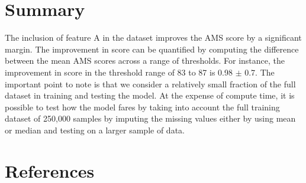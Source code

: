 \documentclass[final,3p,times,onecolumn]{elsarticle}
\begin{document}
\section{Summary}

The inclusion of feature A in the dataset improves the AMS score by a significant margin. The improvement in score can be quantified by computing the difference between the mean AMS scores across a range of thresholds. For instance, the improvement in score in the threshold range of 83 to 87 is 0.98 $\pm$ 0.7. The important point to note is that we consider a relatively small fraction of the full dataset in training and testing the model. At the expense of compute time, it is possible to test how the model fares by taking into account the full training dataset of 250,000 samples by imputing the missing values either by using mean or median and testing on a larger sample of data.

\section*{References}
 

\end{document}
